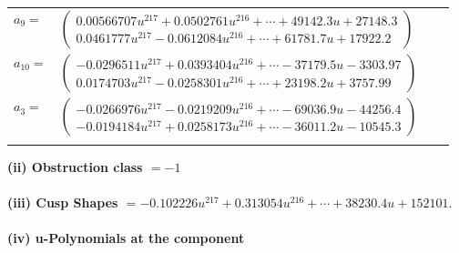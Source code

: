 \documentclass[1p]{elsarticle_modified}
\theoremstyle{definition}
\begin{document}
\begin{tabular}{m{7pt} m{180pt} m{7pt} m{180pt} }
\flushright $a_{9}=$&$\begin{pmatrix}0.00566707 u^{217}+0.0502761 u^{216}+\cdots+49142.3 u+27148.3\\0.0461777 u^{217}-0.0612084 u^{216}+\cdots+61781.7 u+17922.2\end{pmatrix}$ \\
\flushright $a_{10}=$&$\begin{pmatrix}-0.0296511 u^{217}+0.0393404 u^{216}+\cdots-37179.5 u-3303.97\\0.0174703 u^{217}-0.0258301 u^{216}+\cdots+23198.2 u+3757.99\end{pmatrix}$ \\
\flushright $a_{3}=$&$\begin{pmatrix}-0.0266976 u^{217}-0.0219209 u^{216}+\cdots-69036.9 u-44256.4\\-0.0194184 u^{217}+0.0258173 u^{216}+\cdots-36011.2 u-10545.3\end{pmatrix}$\\&\end{tabular}
\flushleft \textbf{(ii) Obstruction class $= -1$}\\~\\
\flushleft \textbf{(iii) Cusp Shapes $= -0.102226 u^{217}+0.313054 u^{216}+\cdots+38230.4 u+152101.$}\\~\\
\newpage\renewcommand{\arraystretch}{1}
\flushleft \textbf{(iv) u-Polynomials at the component}\newline \\
\end{document}
